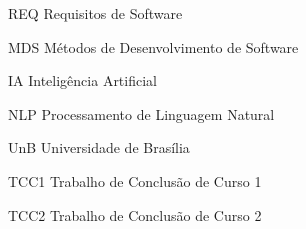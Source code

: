 \begin{siglas}
  \item[REQ] Requisitos de Software
  \item[MDS] Métodos de Desenvolvimento de Software
  \item[IA] Inteligência Artificial
  \item[NLP] Processamento de Linguagem Natural
  \item[UnB] Universidade de Brasília
  \item[TCC1] Trabalho de Conclusão de Curso 1
  \item[TCC2] Trabalho de Conclusão de Curso 2

\end{siglas}
